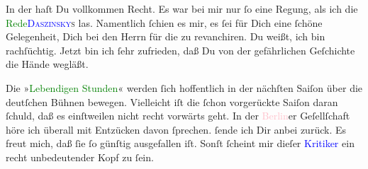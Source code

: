 \pstart
           In der \label{K_L03198-5v}\label{K_L03198-5h} haſt Du vollkommen Recht. Es war bei mir nur ſo eine Regung, als ich die \textcolor{green}{Rede}{}\ledrightnote{{$\rightarrow$}\textcolor{green}{?? [Rede über die Mattachich-Affaire]}}{ }\textsc{\textcolor{blue}{Daszinsky}{}\ledrightnote{\textcolor{blue}{Ignacy Daszyński}}s} las. {\pb}Namentlich ſchien es mir, es ſei für Dich eine
               ſchöne Gelegenheit, Dich bei den Herrn für die \label{K_L03198-6v}\label{K_L03198-6h} zu revanchiren. Du weißt, ich bin rachſüchtig. Jetzt bin ich ſehr zufrieden,
               daß Du von der gefährlichen Geſchichte die Hände wegläßt.\pend
           
\pstart
           Die »\textcolor{green}{Lebendigen Stunden}{}\ledrightnote{\textcolor{green}{Lebendige Stunden. Vier Einakter}}« werden ſich hoffentlich
               in der nächſten Saiſon über die deutſchen Bühnen bewegen. Vielleicht iſt die ſchon
               vorgerückte Saiſon daran ſchuld, daß es einſtweilen nicht recht vorwärts geht. In der
                  \textcolor{pink}{Berlin}{}\ledrightnote{\textcolor{pink}{Berlin}}er Geſellſchaft höre ich überall mit
               Entzücken davon ſprechen. {\pb}\label{K_L03198-7v}\label{K_L03198-7h} ſende ich Dir
               anbei zurück. Es freut mich, daß ſie ſo günſtig ausgefallen iſt. \strikeout{\textcolor{gray}{×}\-\textcolor{gray}{×}\-\textcolor{gray}{×}\-\textcolor{gray}{×}\-\textcolor{gray}{×}\-\textcolor{gray}{×}\-\textcolor{gray}{×}\-\textcolor{gray}{×}\-\textcolor{gray}{×}\-\textcolor{gray}{×}\-\textcolor{gray}{×}\-\textcolor{gray}{×}\-\textcolor{gray}{×}\-\textcolor{gray}{×}\-\textcolor{gray}{×}\-\textcolor{gray}{×}} Sonſt ſcheint mir dieſer \textcolor{blue}{Kritiker}{}\ledrightnote{{$\rightarrow$}\textcolor{blue}{Max Koch}} ein recht unbedeutender Kopf zu ſein.\pend
           
